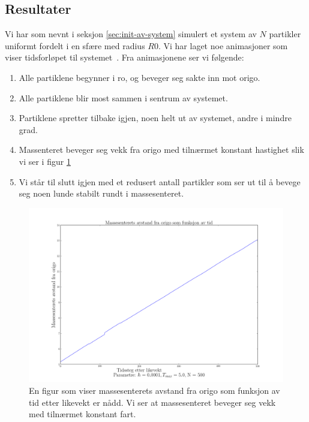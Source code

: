 \documentclass[11pt]{article}
\begin{document}

\cleardoublepage
\begin{multicols}{2}

\section{Resultater}
Vi har som nevnt i seksjon \ref{sec:init-av-system} simulert et system
av $N$ partikler uniformt fordelt i en sfære med radius $R0$. Vi har
laget noe animasjoner som viser tidsforløpet til
systemet~\cite[\texttt{project5/fig/}]{github-repo}. Fra animasjonene
ser vi følgende:
\begin{enumerate}
  \item Alle partiklene begynner i ro, og beveger seg sakte inn mot
    origo.
  \item Alle partiklene blir most sammen i sentrum av systemet.
  \item Partiklene spretter tilbake igjen, noen helt ut av systemet,
    andre i mindre grad.
  \item Massenteret beveger seg vekk fra origo med tilnærmet konstant
    hastighet slik vi ser i figur \ref{fig:massesenter}
  \item Vi står til slutt igjen med et redusert antall partikler som
    ser ut til å bevege seg noen lunde stabilt rundt i massesenteret.
\end{enumerate}


\end{multicols}
\begin{figure}[ht!]
  \centering
  \includegraphics[width=\textwidth]{../fig/massesenter.png}
  \caption{\label{fig:massesenter} En figur som viser massesenterets
  avstand fra origo som funksjon av tid etter likevekt er nådd. Vi ser 
  at massesenteret beveger seg vekk med tilnærmet konstant fart.}
\end{figure}
\end{document}
